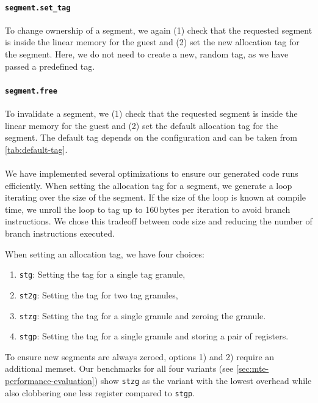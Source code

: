 \paragraph{\texttt{segment.set\_tag}} To change ownership of a segment, we again (1) check that the requested segment is inside the linear memory for the guest and (2) set the new allocation tag for the segment.
Here, we do not need to create a new, random tag, as we have passed a predefined tag.

\paragraph{\texttt{segment.free}} To invalidate a segment, we (1) check that the requested segment is inside the linear memory for the guest and (2) set the default allocation tag for the segment.
The default tag depends on the configuration and can be taken from \cref{tab:default-tag}.

\paragraph{}
We have implemented several optimizations to ensure our generated code runs efficiently.
When setting the allocation tag for a segment, we generate a loop iterating over the size of the segment.
If the size of the loop is known at compile time, we unroll the loop to tag up to 160\,bytes per iteration to avoid branch instructions.
We chose this tradeoff between code size and reducing the number of branch instructions executed.

When setting an allocation tag, we have four choices:
\begin{enumerate}
    \item \texttt{stg}: Setting the tag for a single tag granule,
    \item \texttt{st2g}: Setting the tag for two tag granules,
    \item \texttt{stzg}: Setting the tag for a single granule and zeroing the granule.
    \item \texttt{stgp}: Setting the tag for a single granule and storing a pair of registers.
\end{enumerate}

\noindent
To ensure new segments are always zeroed, options 1) and 2) require an additional memset.
Our benchmarks for all four variants (see \cref{sec:mte-performance-evaluation}) show \texttt{stzg} as the variant with the lowest overhead while also clobbering one less register compared to \texttt{stgp}.

